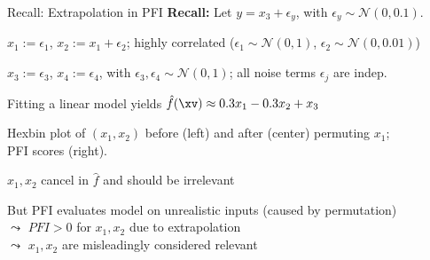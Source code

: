 \documentclass[10pt,compress,t,notes=noshow, xcolor=table]{beamer}
\begin{document}
\begin{framev}[align=top]{Recall: Extrapolation in PFI}
\textbf{Recall:}
Let $y = x_3 + \epsilon_y$, with $\epsilon_y \sim \mathcal{N}(0, 0.1)$.
\begin{itemizeM}
\item $x_1 := \epsilon_1$, $x_2 := x_1 + \epsilon_2$; highly correlated ($\epsilon_1 \sim \mathcal{N}(0,1)$, $\epsilon_2 \sim \mathcal{N}(0, 0.01)$)
\item $x_3 := \epsilon_3$, $x_4 := \epsilon_4$, with $\epsilon_3, \epsilon_4 \sim \mathcal{N}(0,1)$; all noise terms $\epsilon_j$ are indep.
\item Fitting a linear model yields $\hat{f}(\xv) \approx 0.3 x_1 - 0.3 x_2 + x_3$
\end{itemizeM}
Hexbin plot of $(x_1, x_2)$ before (left) and after (center) permuting $x_1$;  
\\PFI scores (right).
\begin{itemizeS}
\item[$\Rightarrow$] $x_1, x_2$ cancel in $\hat{f}$ and should be irrelevant
\item[$\Rightarrow$] But PFI evaluates model on unrealistic inputs (caused by permutation)\\
$\leadsto$ $PFI > 0$ for $x_1, x_2$ due to extrapolation\\
$\leadsto$ $x_1, x_2$ are misleadingly considered relevant
\end{itemizeS}
\end{framev}



\end{document}
